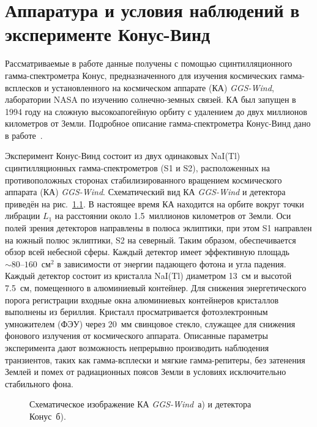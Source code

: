 \chapter{Аппаратура и условия наблюдений в эксперименте Конус-Винд} \label{chapt1}
Рассматриваемые в работе данные получены с помощью сцинтилляционного гамма-спектрометра 
Конус, предназначенного для изучения космических гамма-всплесков и установленного 
на космическом аппарате (КА) \textit{GGS-Wind}, лаборатории NASA по изучению 
солнечно-земных связей. КА был запущен в 1994 году на сложную высокоапогейную орбиту 
с удалением до двух миллионов километров от Земли. Подробное описание гамма-спектрометра 
Конус-Винд дано в работе~\citep{Aptekar1995SSR}.

Эксперимент Конус-Винд состоит из двух одинаковых NaI(Tl) сцинтилляционных 
гамма-спектрометров (S1 и S2), расположенных на противоположных сторонах 
стабилизированного вращением космического аппарата (КА) \textit{GGS-Wind}. 
Схематический вид КА \textit{GGS-Wind} и детектора приведён на рис.~\ref{img:KW_main_view}.
В настоящее время КА находится на орбите вокруг точки либрации $L_1$ 
на расстоянии около 1.5~миллионов километров от Земли. Оси полей зрения детекторов 
направлены в полюса эклиптики, при этом S1 направлен на южный полюс эклиптики, 
S2 на северный. Таким образом, обеспечивается обзор всей небесной сферы. 
Каждый детектор имеет эффективную площадь $\sim 80\textrm{--}160$~см$^2$ в 
зависимости от энергии падающего фотона и угла падения. Каждый детектор состоит 
из кристалла NaI(Tl) диаметром 13~см и высотой 7.5~см, помещенного в алюминиевый 
контейнер. Для снижения энергетического порога регистрации входные окна алюминиевых 
контейнеров кристаллов выполнены из бериллия. Кристалл просматривается фотоэлектронным 
умножителем (ФЭУ) через 20~мм свинцовое стекло, служащее для снижения фонового 
излучения от космического аппарата. Описанные параметры эксперимента дают 
возможность непрерывно производить наблюдения транзиентов, таких как гамма-всплески 
и мягкие гамма-репитеры, без затенения Землей и помех от радиационных поясов Земли 
в условиях исключительно стабильного фона. 

\begin{figure}[h]
  \begin{minipage}[h]{0.5\textwidth}
  \end{minipage}
  \hfill
  \begin{minipage}[h]{0.5\textwidth}
  \end{minipage}
  \caption[Схематическое изображение КА \textit{GGS-Wind} и детектора Конус.]
  {Схематическое изображение КА \textit{GGS-Wind}~а) и детектора Конус~б).}
  \label{img:KW_main_view}  
\end{figure}

